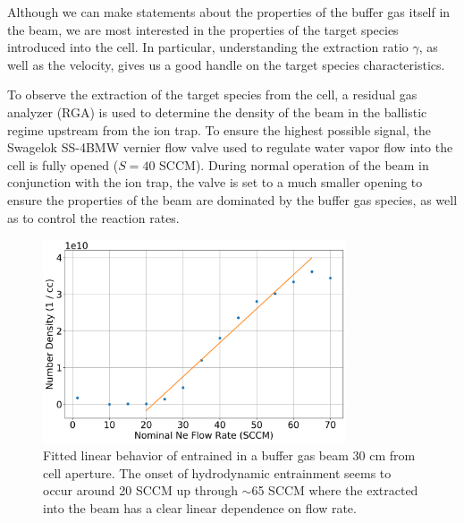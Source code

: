 Although we can make statements about the properties of the buffer gas itself in the beam, we are most interested in the properties of the target species introduced into the cell. In particular, understanding the extraction ratio $\gamma$, as well as the velocity, gives us a good handle on the target species characteristics.

To observe the extraction of the target species from the cell, a residual gas analyzer (RGA) is used to determine the density of the beam in the ballistic regime upstream from the ion trap. To ensure the highest possible signal, the Swagelok SS-4BMW vernier flow valve used to regulate water vapor flow into the cell is fully opened ($S=40$ SCCM). During normal operation of the beam in conjunction with the ion trap, the valve is set to a much smaller opening to ensure the properties of the beam are dominated by the buffer gas species, as well as to control the reaction rates.

\begin{figure}[H]
	\centering
	\includegraphics[width=0.8\textwidth]{images/CBGB_hydrodynamic_fit.png}
	\caption{Fitted linear behavior of  entrained in a  buffer gas beam 30 cm from cell aperture. The onset of hydrodynamic entrainment seems to occur around 20 SCCM up through $\sim$65 SCCM where the  extracted into the beam has a clear linear dependence on flow rate.}
	\label{fig: rga entrainment}
\end{figure}

